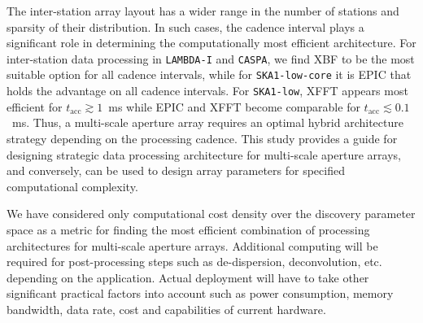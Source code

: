\documentclass[
  journal=pasa,
  manuscript=article-type,
  year=2020,
  volume=37,
]{cup-journal}
\begin{document}
The inter-station array layout has a wider range in the number of stations and sparsity of their distribution. In such cases, the cadence interval plays a significant role in determining the computationally most efficient architecture. For inter-station data processing in \texttt{LAMBDA-I} and \texttt{CASPA}, we find XBF to be the most suitable option for all cadence intervals, while for \texttt{SKA1-low-core} it is EPIC that holds the advantage on all cadence intervals. For \texttt{SKA1-low}, XFFT appears most efficient for $t_\textrm{acc}\gtrsim 1$~ms while EPIC and XFFT become comparable for $t_\textrm{acc}\lesssim 0.1$~ms. Thus, a multi-scale aperture array requires an optimal hybrid architecture strategy depending on the processing cadence. This study provides a guide for designing strategic data processing architecture for multi-scale aperture arrays, and conversely, can be used to design array parameters for specified computational complexity. 

We have considered only computational cost density over the discovery parameter space as a metric for finding the most efficient combination of processing architectures for multi-scale aperture arrays. Additional computing will be required for post-processing steps such as de-dispersion, deconvolution, etc. depending on the application. Actual deployment will have to take other significant practical factors into account such as power consumption, memory bandwidth, data rate, cost and capabilities of current hardware.


\end{document}
